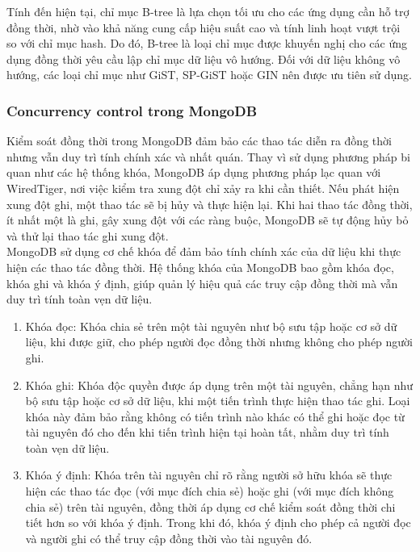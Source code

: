 Tính đến hiện tại, chỉ mục B-tree là lựa chọn tối ưu cho các ứng dụng cần hỗ trợ đồng thời, nhờ vào khả năng cung cấp hiệu suất cao và tính linh hoạt vượt trội so với chỉ mục hash. Do đó, B-tree là loại chỉ mục được khuyến nghị cho các ứng dụng đồng thời yêu cầu lập chỉ mục dữ liệu vô hướng. Đối với dữ liệu không vô hướng, các loại chỉ mục như GiST, SP-GiST hoặc GIN nên được ưu tiên sử dụng.
\subsubsection{Concurrency control trong MongoDB}
\indent Kiểm soát đồng thời trong MongoDB đảm bảo các thao tác diễn ra đồng thời nhưng vẫn duy trì tính chính xác và nhất quán. Thay vì sử dụng phương pháp bi quan như các hệ thống khóa, MongoDB áp dụng phương pháp lạc quan với WiredTiger, nơi việc kiểm tra xung đột chỉ xảy ra khi cần thiết. Nếu phát hiện xung đột ghi, một thao tác sẽ bị hủy và thực hiện lại. Khi hai thao tác đồng thời, ít nhất một là ghi, gây xung đột với các ràng buộc, MongoDB sẽ tự động hủy bỏ và thử lại thao tác ghi xung đột.\\

MongoDB sử dụng cơ chế khóa để đảm bảo tính chính xác của dữ liệu khi thực hiện các thao tác đồng thời. Hệ thống khóa của MongoDB bao gồm khóa đọc, khóa ghi và khóa ý định, giúp quản lý hiệu quả các truy cập đồng thời mà vẫn duy trì tính toàn vẹn dữ liệu.
\begin{enumerate}
    \item Khóa đọc: Khóa chia sẻ trên một tài nguyên như bộ sưu tập hoặc cơ sở dữ liệu, khi được giữ, cho phép người đọc đồng thời nhưng không cho phép người ghi. 
    \item Khóa ghi: Khóa độc quyền được áp dụng trên một tài nguyên, chẳng hạn như bộ sưu tập hoặc cơ sở dữ liệu, khi một tiến trình thực hiện thao tác ghi. Loại khóa này đảm bảo rằng không có tiến trình nào khác có thể ghi hoặc đọc từ tài nguyên đó cho đến khi tiến trình hiện tại hoàn tất, nhằm duy trì tính toàn vẹn dữ liệu.
    \item Khóa ý định: Khóa trên tài nguyên chỉ rõ rằng người sở hữu khóa sẽ thực hiện các thao tác đọc (với mục đích chia sẻ) hoặc ghi (với mục đích không chia sẻ) trên tài nguyên, đồng thời áp dụng cơ chế kiểm soát đồng thời chi tiết hơn so với khóa ý định. Trong khi đó, khóa ý định cho phép cả người đọc và người ghi có thể truy cập đồng thời vào tài nguyên đó.
\end{enumerate}

